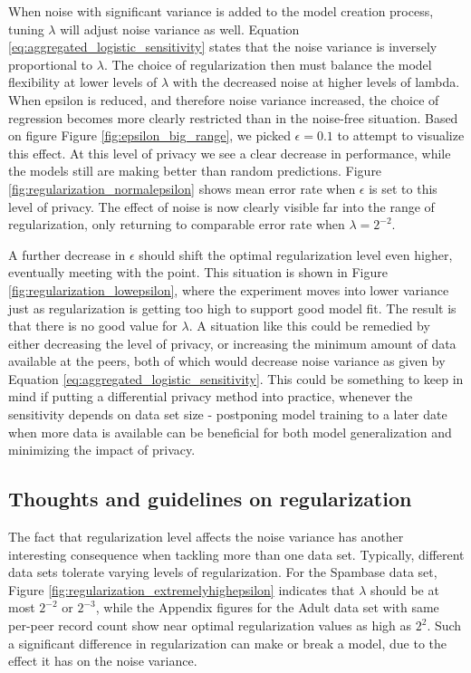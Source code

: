 When noise with significant variance is added to the model creation process, tuning $\lambda$ will adjust noise variance as well. Equation \ref{eq:aggregated_logistic_sensitivity} states that the noise variance is inversely proportional to $\lambda$. The choice of regularization then must balance the model flexibility at lower levels of $\lambda$ with the decreased noise at higher levels of lambda. When epsilon is reduced, and therefore noise variance increased, the choice of regression becomes more clearly restricted than in the noise-free situation. Based on figure Figure \ref{fig:epsilon_big_range}, we picked $\epsilon = 0.1$ to attempt to visualize this effect. At this level of privacy we see a clear decrease in performance, while the models still are making better than random predictions. Figure \ref{fig:regularization_normalepsilon} shows mean error rate when $\epsilon$ is set to this level of privacy. The effect of noise is now clearly visible far into the range of regularization, only returning to comparable error rate when $\lambda = 2^{-2}$. 

A further decrease in $\epsilon$ should shift the optimal regularization level even higher, eventually meeting with the point. This situation is shown in Figure \ref{fig:regularization_lowepsilon}, where the experiment moves into lower variance just as regularization is getting too high to support good model fit. The result is that there is no good value for $\lambda$. A situation like this could be remedied by either decreasing the level of privacy, or increasing the minimum amount of data available at the peers, both of which would decrease noise variance as given by Equation \ref{eq:aggregated_logistic_sensitivity}. This could be something to keep in mind if putting a differential privacy method into practice, whenever the sensitivity depends on data set size - postponing model training to a later date when more data is available can be beneficial for both model generalization and minimizing the impact of privacy.

\subsection{Thoughts and guidelines on regularization}
\label{sec:reg_thoughts_guidelines}
The fact that regularization level affects the noise variance has another interesting consequence when tackling more than one data set. Typically, different data sets tolerate varying levels of regularization. For the Spambase data set, Figure \ref{fig:regularization_extremelyhighepsilon} indicates that $\lambda$ should be at most $2^{-2}$ or $2^{-3}$, while the Appendix figures for the Adult data set with same per-peer record count show near optimal regularization values as high as $2^2$. Such a significant difference in regularization can make or break a model, due to the effect it has on the noise variance.

